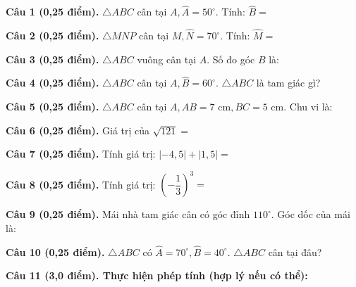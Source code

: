 \documentclass[12pt,a4paper]{article}
\begin{document}
\vspace{1.2mm}
\noindent\textbf{Câu 1 (0,25 điểm).} $\triangle ABC$ cân tại $A, \widehat{A} = 50^\circ$. Tính: $\widehat{B} =$ \par\vspace{2.5mm}
\noindent\textbf{Câu 2 (0,25 điểm).} $\triangle MNP$ cân tại $M, \widehat{N} = 70^\circ$. Tính: $\widehat{M} =$ \par\vspace{2.5mm}
\noindent\textbf{Câu 3 (0,25 điểm).} $\triangle ABC$ vuông cân tại $A$. Số đo góc $B$ là: \par\vspace{2.5mm}
\noindent\textbf{Câu 4 (0,25 điểm).} $\triangle ABC$ cân tại $A, \widehat{B} = 60^\circ$. $\triangle ABC$ là tam giác gì? \par\vspace{2.5mm}
\noindent\textbf{Câu 5 (0,25 điểm).} $\triangle ABC$ cân tại $A, AB = 7\text{ cm}, BC = 5\text{ cm}$. Chu vi là: \par\vspace{2.5mm}
\noindent\textbf{Câu 6 (0,25 điểm).} Giá trị của $\sqrt{121} =$ \par\vspace{2.5mm}
\noindent\textbf{Câu 7 (0,25 điểm).} Tính giá trị: $|-4{,}5| + |1{,}5| =$ \par\vspace{2.5mm}
\noindent\textbf{Câu 8 (0,25 điểm).} Tính giá trị: $\left(-\dfrac{1}{3}\right)^3 =$ \par\vspace{2.5mm}
\noindent\textbf{Câu 9 (0,25 điểm).} Mái nhà tam giác cân có góc đỉnh $110^\circ$. Góc dốc của mái là: \par\vspace{2.5mm}
\noindent\textbf{Câu 10 (0,25 điểm).} $\triangle ABC$ có $\widehat{A} = 70^\circ, \widehat{B} = 40^\circ$. $\triangle ABC$ cân tại đâu? \par\vspace{2.5mm}
\vspace{0.2mm}
\noindent\textbf{Câu 11 (3,0 điểm). Thực hiện phép tính (hợp lý nếu có thể):}
\vspace{0.5mm}
\end{document}
